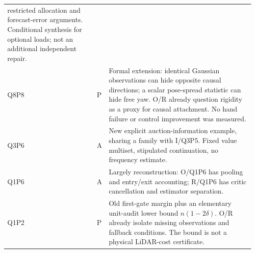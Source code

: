 \documentclass[11pt,a4paper]{article}
\begin{document}
\begin{longtable}{p{17mm}p{7mm}p{112mm}}
restricted allocation and forecast-error arguments. Conditional synthesis
for optional loads; not an additional independent repair.\\
Q8P8&P&Formal extension: identical Gaussian observations can hide opposite
causal directions; a scalar pose-spread statistic can hide free yaw. O/R
already question rigidity as a proxy for causal attachment. No hand failure
or control improvement was measured.\\
Q3P6&A&New explicit auction-information example, sharing a family with
I/Q3P5. Fixed value multiset, stipulated continuation, no frequency estimate.\\
Q1P6&A&Largely reconstruction: O/Q1P6 has pooling and entry/exit accounting;
R/Q1P6 has critic cancellation and estimator separation.\\
Q1P2&P&Old first-gate margin plus an elementary unit-audit lower bound
$n(1-2\delta)$. O/R already isolate missing observations and fallback
conditions. The bound is not a physical LiDAR-cost certificate.\\
\bottomrule
\end{longtable}
\end{document}
